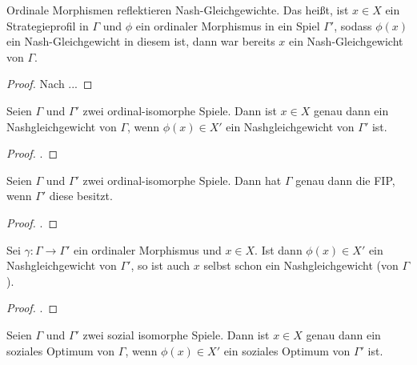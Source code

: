 \begin{kor}
	Ordinale Morphismen reflektieren Nash-Gleichgewichte. Das heißt, ist $x \in X$ ein Strategieprofil in $\Gamma$ und $\phi$ ein ordinaler Morphismus in ein Spiel $\Gamma'$, sodass $\phi(x)$ ein Nash-Gleichgewicht in diesem ist, dann war bereits $x$ ein Nash-Gleichgewicht von $\Gamma$.
\end{kor}

\begin{proof}
	Nach  ... 
\end{proof}



\begin{lemma}
	Seien $\Gamma$ und $\Gamma'$ zwei ordinal-isomorphe Spiele. Dann ist $x \in X$ genau dann ein Nashgleichgewicht von $\Gamma$, wenn $\phi(x) \in X'$ ein Nashgleichgewicht von $\Gamma'$ ist.
\end{lemma}

\begin{proof}.
	
\end{proof}

\begin{lemma}
	Seien $\Gamma$ und $\Gamma'$ zwei ordinal-isomorphe Spiele. Dann hat $\Gamma$ genau dann die FIP, wenn $\Gamma'$ diese besitzt.
\end{lemma}

\begin{proof}.
	
\end{proof}

\begin{lemma}
	Sei $\gamma: \Gamma \to \Gamma'$ ein ordinaler Morphismus und $x \in X$. Ist dann $\phi(x) \in X'$ ein Nashgleichgewicht von $\Gamma'$, so ist auch $x$ selbst schon ein Nashgleichgewicht (von $\Gamma$).
\end{lemma}

\begin{proof}
	.
	
\end{proof}

\begin{lemma}
	Seien $\Gamma$ und $\Gamma'$ zwei sozial isomorphe Spiele. Dann ist $x \in X$ genau dann ein soziales Optimum von $\Gamma$, wenn $\phi(x) \in X'$ ein soziales Optimum von $\Gamma'$ ist.
\end{lemma}

